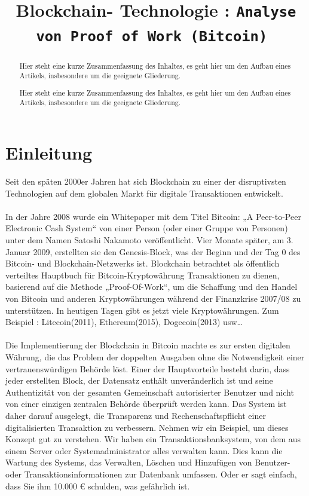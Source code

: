 \documentclass[ngerman]{scrreprt}
\title{Blockchain- Technologie : \texttt{Analyse von Proof of Work (Bitcoin) }}
\begin{document}
  \maketitle  
  \begin{abstract}
    Hier steht eine kurze Zusammenfassung des Inhaltes, es geht hier um den Aufbau eines Artikels, insbesondere um die geeignete Gliederung.
  \end{abstract}

   \begin{abstract}
   	Hier steht eine kurze Zusammenfassung des Inhaltes, es geht hier um den Aufbau eines Artikels, insbesondere um die geeignete Gliederung.
   \end{abstract}

  \tableofcontents


\chapter{Einleitung}
Seit den späten 2000er Jahren hat sich Blockchain zu einer der disruptivsten Technologien auf dem globalen Markt für digitale Transaktionen entwickelt.\\ \\
In der Jahre 2008 wurde ein Whitepaper mit dem Titel Bitcoin: „A Peer-to-Peer Electronic Cash System“ von einer Person (oder einer Gruppe von Personen) unter dem Namen Satoshi Nakamoto veröffentlicht. Vier Monate später, am 3. Januar 2009, erstellten sie den Genesis-Block, was der Beginn und der Tag 0 des Bitcoin- und Blockchain-Netzwerks ist. Blockchain betrachtet als öffentlich verteiltes Hauptbuch für Bitcoin-Kryptowährung Transaktionen zu dienen, basierend auf die Methode „Proof-Of-Work“, um die Schaffung und den Handel von Bitcoin und anderen Kryptowährungen während der Finanzkrise 2007/08 zu unterstützen. In heutigen Tagen gibt es jetzt viele Kryptowährungen. Zum Beispiel : Litecoin(2011), Ethereum(2015), Dogecoin(2013) usw… \\ \\
Die Implementierung der Blockchain in Bitcoin machte es zur ersten digitalen Währung, die das Problem der doppelten Ausgaben ohne die Notwendigkeit einer vertrauenswürdigen Behörde löst. Einer der Hauptvorteile besteht darin, dass jeder erstellten Block, der Datensatz enthält unveränderlich ist und seine Authentizität von der gesamten Gemeinschaft autorisierter Benutzer und nicht von einer einzigen zentralen Behörde überprüft werden kann. Das System ist daher darauf ausgelegt, die Transparenz und Rechenschaftspflicht einer digitalisierten Transaktion zu verbessern. Nehmen wir ein Beispiel, um dieses Konzept gut zu verstehen. Wir haben ein Transaktionsbanksystem, von dem aus einem Server oder Systemadministrator alles verwalten kann. Dies kann die Wartung des Systems, das Verwalten, Löschen und Hinzufügen von Benutzer- oder Transaktionsinformationen zur Datenbank umfassen. Oder er sagt einfach, dass Sie ihm 10.000 € schulden, was gefährlich ist. \\ \\
\end{document}
